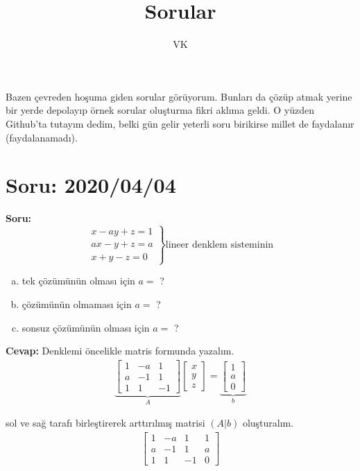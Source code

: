 \documentclass{article}
\title{Sorular}
\author{VK}
\begin{document}
\maketitle

Bazen çevreden hoşuma giden sorular görüyorum. Bunları da çözüp atmak yerine bir yerde depolayıp örnek sorular oluşturma fikri aklıma geldi. O yüzden Github'ta tutayım dedim, belki gün gelir yeterli soru birikirse millet de faydalanır (faydalanamadı).

\section{Soru: 2020/04/04}
\textbf{Soru:}
$$
\left. \begin{array}{r}
x-ay +z = 1\\
ax - y +z =a \\
x + y -z = 0 
\end{array} \right\} \text{lineer denklem sisteminin}
$$

\begin{enumerate}[(a)]
	\item tek çözümünün olması için $a=$ ?
	\item çözümünün olmaması için $a=$ ?
	\item sonsuz çözümünün olması için $a=$ ?
\end{enumerate}
\textbf{Cevap: }
Denklemi öncelikle matris formunda yazalım. 
%
\begin{align}
	\underbrace{\left[\begin{matrix}
		1 & -a & 1 \\
		a & -1 & 1 \\
		1 &  1 & -1 
		\end{matrix}\right]}_{A}\left[\begin{matrix}
	x \\
	y \\
	z
	\end{matrix}\right] = \underbrace{\left[\begin{matrix}
		1 \\
		a \\
		0
		\end{matrix}\right]}_{b}
\end{align}

sol ve sağ tarafı birleştirerek arttırılmış matrisi $(A|b)$ oluşturalım. 
%
\begin{align}
\left[\begin{array}{ccc|c}
1 & -a & 1  &1 \\
a & -1 & 1  &a\\
1 &  1 & -1 &0
\end{array}\right]
\end{align}
\end{document}

